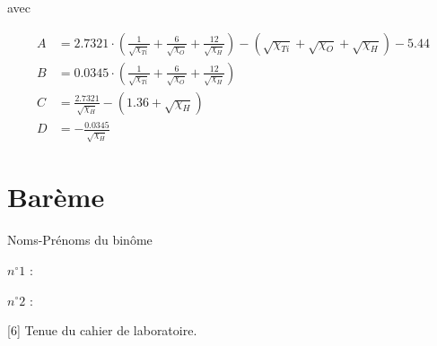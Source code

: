 \documentclass[twoside,a4paper,11pt,addpoints]{exam}%
\newcounter{foo} %
\begin{document}
\begin{questions}
\begin{mybox}
\begin{solution}[5cm]
avec 

\begin{align*}
A &= 2.7321 \cdot \left( \frac{1}{\sqrt{\chi_{Ti}}} + \frac{6}{\sqrt{\chi_{O}}} + \frac{12}{\sqrt{\chi_{H}}}\right) - ( \sqrt{\chi_{Ti}} + \sqrt{\chi_{O}} + \sqrt{\chi_{H}}) - 5.44 \\
B &= 0.0345 \cdot \left( \frac{1}{\sqrt{\chi_{Ti}}} + \frac{6}{\sqrt{\chi_{O}}} + \frac{12}{\sqrt{\chi_{H}}}\right) \\
C &= \frac{2.7321}{\sqrt{\chi_H}} - (1.36 + \sqrt{\chi_H}) \\
D &= - \frac{0.0345}{\sqrt{\chi_H}}
\end{align*}

\end{solution}
\end{mybox}

\setcounter{foo}{\value{question}}

\end{questions}

\newpage

\section*{Barème}

\begin{minipage}{0.33\textwidth}
Noms-Prénoms du binôme
\end{minipage}\begin{minipage}{0.33\textwidth}
$n^\circ 1$ :
\end{minipage}\begin{minipage}{0.33\textwidth}
$n^\circ 2$ :
\end{minipage}

\begin{questions}
\setcounter{question}{\thefoo}

[6] Tenue du cahier de laboratoire.


\end{questions}

\begin{center}
\gradetable
\bonusgradetable
\end{center}
\end{document}
